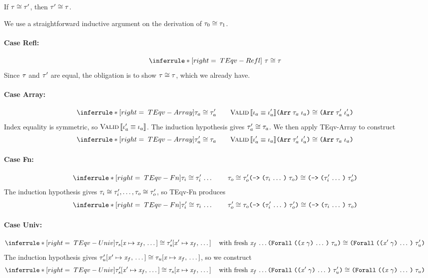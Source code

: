 \begin{lemma}
  \label{SymTEqv}
  If $\mathit{\tau} \cong \mathit{\tau}'$,
  then $\mathit{\tau}' \cong \mathit{\tau}$.
\end{lemma}
\begin{sproof}
  We use a straightforward inductive argument on the derivation of $\mathit{\tau}_0 \cong \mathit{\tau}_1$.
  \paragraph{Case {\sc Refl}:}
  \[\infr[TEqv-Refl]{\ }{\teqv{\type}{\type}}\]
  Since $\mathit{\tau}$ and $\mathit{\tau}'$ are equal,
  the obligation is to show $\mathit{\tau} \cong \mathit{\tau}$,
  which we already have.
  \paragraph{Case {\sc Array}:}
  \[\infr[TEqv-Array]
  {\teqv{\type_a}{\type_a'} \qquad \ieqv{\idx_a}{\idx_a'}}
  {\teqv{\typearray{\type_a}{\idx_a}}{\typearray{\type_a'}{\idx_a'}}}\]
  Index equality is symmetric, so $\text{\sc Valid} \left\llbracket \mathit{\iota}_a' \equiv \mathit{\iota}_a \right\rrbracket$.
  The induction hypothesis gives $\mathit{\tau}_a' \cong \mathit{\tau}_a$.
  We then apply {\sc TEqv-Array} to construct
  \[\infr[TEqv-Array]
  {\teqv{\type_a'}{\type_a} \qquad \ieqv{\idx_a'}{\idx_a}}
  {\teqv{\typearray{\type_a'}{\idx_a'}}{\typearray{\type_a}{\idx_a}}}\]
  \paragraph{Case {\sc Fn}:}
  \[\infr[TEqv-Fn]
  {\sequence{\teqv{\type_i}{\type_i'}}
    \qquad
  \teqv{\type_o}{\type_o'}}
  {\teqv{\typefun{\sequence{\type_i}}{\type_o}}{\typefun{\sequence{\type_i'}}{\type_o'}}}\]
  The induction hypothesis gives
  $\mathit{\tau}_i \cong \mathit{\tau}_i', \dots, \mathit{\tau}_o \cong \mathit{\tau}_o'$,
  so {\sc TEqv-Fn} produces
  \[\infr[TEqv-Fn]
  {\sequence{\teqv{\type_i'}{\type_i}}
    \qquad
  \teqv{\type_o'}{\type_o}}
  {\teqv{\typefun{\sequence{\type_i'}}{\type_o'}}{\typefun{\sequence{\type_i}}{\type_o}}}\]
  \paragraph{Case {\sc Univ}:}
  \[\infr[TEqv-Univ]
  {\teqv
    {\seqsubst{\type_s}{\var}{\var_f}}
    {\seqsubst{\type_s'}{\var'}{\var_f}}
    \fresh{\sequence{\var_f}}}
  {\teqv
    {\typeuniv{\sequence{\notevar{\var}{\sort}}}{\type_u}}
    {\typeuniv{\sequence{\notevar{\var'}{\sort}}}{\type_u'}}}\]
  The induction hypothesis gives
  $\mathit{\tau}_u'\hspace{-2pt}\left[ \mathit{x}' \mapsto \mathit{x}_f, \, \ldots \, \right] \cong \mathit{\tau}_u\hspace{-2pt}\left[ \mathit{x} \mapsto \mathit{x}_f, \, \ldots \, \right]$,
  so we construct
  \[\infr[TEqv-Univ]
  {\teqv
    {\seqsubst{\type_s'}{\var'}{\var_f}}
    {\seqsubst{\type_s}{\var}{\var_f}}
    \fresh{\sequence{\var_f}}}
  {\teqv
    {\typeuniv{\sequence{\notevar{\var'}{\sort}}}{\type_u'}}
    {\typeuniv{\sequence{\notevar{\var}{\sort}}}{\type_u}}}\]

\end{sproof}
